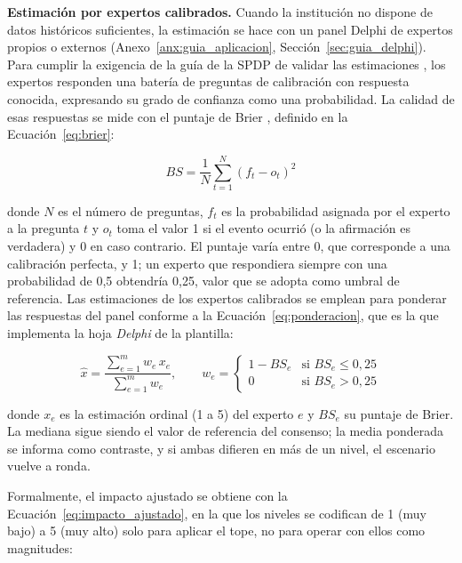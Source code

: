 \textbf{Estimación por expertos calibrados.} Cuando la institución no dispone de datos históricos suficientes, la estimación se hace con un panel Delphi de expertos propios o externos (Anexo~\ref{anx:guia_aplicacion}, Sección~\ref{sec:guia_delphi}). Para cumplir la exigencia de la guía de la SPDP de validar las estimaciones \cite{spdp2026guiav2}, los expertos responden una batería de preguntas de calibración con respuesta conocida, expresando su grado de confianza como una probabilidad. La calidad de esas respuestas se mide con el puntaje de Brier \cite{brier1950verification}, definido en la Ecuación~\ref{eq:brier}:

\begin{equation}
\label{eq:brier}
BS = \frac{1}{N} \sum_{t=1}^{N} \left( f_t - o_t \right)^2
\end{equation}

\noindent donde $N$ es el número de preguntas, $f_t$ es la probabilidad asignada por el experto a la pregunta $t$ y $o_t$ toma el valor 1 si el evento ocurrió (o la afirmación es verdadera) y 0 en caso contrario. El puntaje varía entre 0, que corresponde a una calibración perfecta, y 1; un experto que respondiera siempre con una probabilidad de 0,5 obtendría 0,25, valor que se adopta como umbral de referencia. Las estimaciones de los expertos calibrados se emplean para ponderar las respuestas del panel conforme a la Ecuación~\ref{eq:ponderacion}, que es la que implementa la hoja \textit{Delphi} de la plantilla:

\begin{equation}
\label{eq:ponderacion}
\hat{x} = \frac{\sum_{e=1}^{m} w_e\, x_e}{\sum_{e=1}^{m} w_e}, \qquad
w_e = \begin{cases} 1 - BS_e & \text{si } BS_e \le 0{,}25 \\ 0 & \text{si } BS_e > 0{,}25 \end{cases}
\end{equation}

\noindent donde $x_e$ es la estimación ordinal (1 a 5) del experto $e$ y $BS_e$ su puntaje de Brier. La mediana sigue siendo el valor de referencia del consenso; la media ponderada se informa como contraste, y si ambas difieren en más de un nivel, el escenario vuelve a ronda.

Formalmente, el impacto ajustado se obtiene con la Ecuación~\ref{eq:impacto_ajustado}, en la que los niveles se codifican de 1 (muy bajo) a 5 (muy alto) solo para aplicar el tope, no para operar con ellos como magnitudes:

